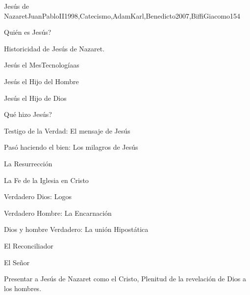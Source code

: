 \begin{syllabus}
\begin{unit}{Jesús de Nazaret}{JuanPabloII1998,Catecismo,AdamKarl,Benedicto2007,BiffiGiacomo}{15}{4}
\begin{topics}
      \item Quién es Jesús?
      \begin{inparaenum}
      \item Historicidad de Jesús de Nazaret.
      \item Jesús el MesTecnologíaas
      \item Jesús el Hijo del Hombre
      \item Jesús el Hijo de Dios
\end{inparaenum}
      \item Qué hizo Jesús?
      \begin{inparaenum}
      \item Testigo de la Verdad: El mensaje de Jesús
      \item Pasó haciendo el bien: Los milagros de Jesús
      \item La Resurrección
\end{inparaenum}
      \item La Fe de la Iglesia en Cristo
      \begin{inparaenum}
      \item Verdadero Dios: Logos
      \item Verdadero Hombre: La Encarnación
      \item Dios y hombre Verdadero: La unión Hipostática
      \item El Reconciliador
      \item El Señor
	\end{inparaenum}

\end{topics}

\begin{learningoutcomes}
      \item Presentar a Jesús de Nazaret como el Cristo, Plenitud de la revelación de Dios a los hombres.
\end{learningoutcomes}
\end{unit}


\end{syllabus}
